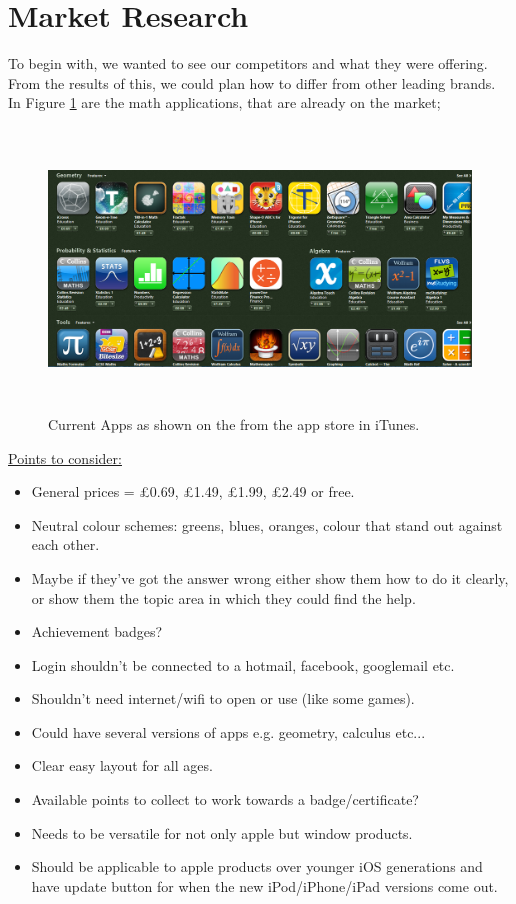 \documentclass[10pt, a4paper]{article}
\begin{document}
\section{Market Research}
To begin with, we wanted to see our competitors and what they were offering. From the results of this, we could plan how to differ from other leading brands.\\
In Figure \ref{Appstore} are the math applications, that are already on the market;
\begin{figure}[H]
	\begin{center}
		\includegraphics[height= 7.5cm]{images/Picture5.png}
		\caption{Current Apps as shown on the from the app store in iTunes. \cite{appstore}}
		\label{Appstore}
	\end{center}
\end{figure}
\underline{Points to consider:}
\begin{itemize}
	\item General prices = £0.69, £1.49, £1.99, £2.49 or free.
	\item Neutral colour schemes: greens, blues, oranges, colour that stand out against each other.
	\item Maybe if they've got the answer wrong either show them how to do it clearly, or show them the topic area in which they could find the help.
	\item Achievement badges?
	\item Login shouldn't be connected to a hotmail, facebook, googlemail etc.
	\item Shouldn't need internet/wifi to open or use (like some games).
	\item Could have several versions of apps e.g. geometry, calculus etc...
	\item Clear easy layout for all ages.
	\item Available points to collect to work towards a badge/certificate?
	\item Needs to be versatile for not only apple but window products.
	\item Should be applicable to apple products over younger iOS generations and have update button for when the new iPod/iPhone/iPad versions come out.
\end{itemize}
\end{document}
